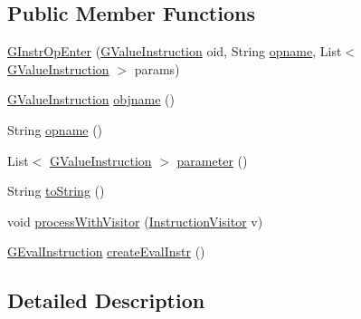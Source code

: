 \subsection*{Public Member Functions}
\begin{DoxyCompactItemize}
\item 
\hyperlink{classorg_1_1tzi_1_1use_1_1gen_1_1assl_1_1statics_1_1_g_instr_op_enter_add0ea8f08c9f37518c3f9600c1be7b5f}{G\-Instr\-Op\-Enter} (\hyperlink{interfaceorg_1_1tzi_1_1use_1_1gen_1_1assl_1_1statics_1_1_g_value_instruction}{G\-Value\-Instruction} oid, String \hyperlink{classorg_1_1tzi_1_1use_1_1gen_1_1assl_1_1statics_1_1_g_instr_op_enter_a79287e3023f040ace13099610b4b7b31}{opname}, List$<$ \hyperlink{interfaceorg_1_1tzi_1_1use_1_1gen_1_1assl_1_1statics_1_1_g_value_instruction}{G\-Value\-Instruction} $>$ params)
\item 
\hyperlink{interfaceorg_1_1tzi_1_1use_1_1gen_1_1assl_1_1statics_1_1_g_value_instruction}{G\-Value\-Instruction} \hyperlink{classorg_1_1tzi_1_1use_1_1gen_1_1assl_1_1statics_1_1_g_instr_op_enter_ad0bad7e7eeff34a7c589ce78ba607dc9}{objname} ()
\item 
String \hyperlink{classorg_1_1tzi_1_1use_1_1gen_1_1assl_1_1statics_1_1_g_instr_op_enter_a79287e3023f040ace13099610b4b7b31}{opname} ()
\item 
List$<$ \hyperlink{interfaceorg_1_1tzi_1_1use_1_1gen_1_1assl_1_1statics_1_1_g_value_instruction}{G\-Value\-Instruction} $>$ \hyperlink{classorg_1_1tzi_1_1use_1_1gen_1_1assl_1_1statics_1_1_g_instr_op_enter_a8b5fe4dc50d46d596c25b588c479825f}{parameter} ()
\item 
String \hyperlink{classorg_1_1tzi_1_1use_1_1gen_1_1assl_1_1statics_1_1_g_instr_op_enter_ab00f21a55260e7ae8d56c59570663aee}{to\-String} ()
\item 
void \hyperlink{classorg_1_1tzi_1_1use_1_1gen_1_1assl_1_1statics_1_1_g_instr_op_enter_a59a59887e786080151d57b7b938cdb45}{process\-With\-Visitor} (\hyperlink{interfaceorg_1_1tzi_1_1use_1_1gen_1_1assl_1_1statics_1_1_instruction_visitor}{Instruction\-Visitor} v)
\item 
\hyperlink{classorg_1_1tzi_1_1use_1_1gen_1_1assl_1_1dynamics_1_1_g_eval_instruction}{G\-Eval\-Instruction} \hyperlink{classorg_1_1tzi_1_1use_1_1gen_1_1assl_1_1statics_1_1_g_instr_op_enter_a087d432b80e854be4df962490080cbdc}{create\-Eval\-Instr} ()
\end{DoxyCompactItemize}


\subsection{Detailed Description}


